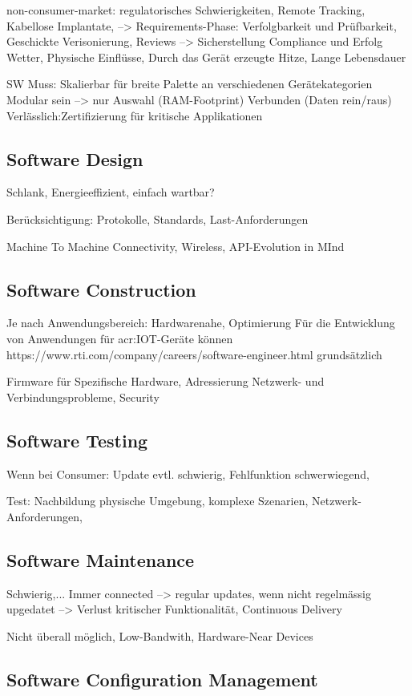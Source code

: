 non-consumer-market: regulatorisches Schwierigkeiten, Remote Tracking, Kabellose Implantate, --> Requirements-Phase: Verfolgbarkeit und Prüfbarkeit, Geschickte Verisonierung, Reviews --> Sicherstellung Compliance und Erfolg
Wetter, Physische Einflüsse, Durch das Gerät erzeugte Hitze, Lange Lebensdauer

SW Muss: Skalierbar für breite Palette an verschiedenen Gerätekategorien
Modular sein --> nur Auswahl (RAM-Footprint)
Verbunden (Daten rein/raus)
Verlässlich:Zertifizierung für kritische Applikationen
\subsection{Software Design}
Schlank, Energieeffizient, einfach wartbar?

Berücksichtigung: Protokolle, Standards, Last-Anforderungen

Machine To Machine Connectivity, Wireless, API-Evolution in MInd
\subsection{Software Construction}
Je nach Anwendungsbereich: Hardwarenahe, Optimierung
Für die Entwicklung von Anwendungen für \gls{acr:IOT}-Geräte können
https://www.rti.com/company/careers/software-engineer.html grundsätzlich


Firmware für Spezifische Hardware, Adressierung Netzwerk- und Verbindungsprobleme, Security


\subsection{Software Testing}
Wenn bei Consumer: Update evtl. schwierig, Fehlfunktion schwerwiegend,

Test: Nachbildung physische Umgebung, komplexe Szenarien, Netzwerk-Anforderungen, 

\subsection{Software Maintenance}
Schwierig,...
Immer connected --> regular updates, wenn nicht regelmässig upgedatet --> Verlust kritischer Funktionalität, Continuous Delivery

Nicht überall möglich, Low-Bandwith, Hardware-Near Devices


\subsection{Software Configuration Management}


